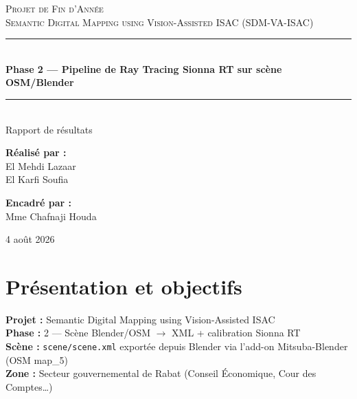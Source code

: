 \documentclass[11pt,a4paper]{article}
\begin{document}
\begin{titlepage}
    \centering
    \vspace*{1.5cm}

    {\large \textsc{Projet de Fin d'Année}}\\[0.3cm]
    {\large \textsc{Semantic Digital Mapping using Vision-Assisted ISAC (SDM-VA-ISAC)}}\\[2cm]

    \rule{\linewidth}{0.5mm}\\[0.4cm]
    {\huge \bfseries Phase 2 --- Pipeline de Ray Tracing Sionna RT sur scène OSM/Blender}\\[0.4cm]
    \rule{\linewidth}{0.5mm}\\[1.5cm]

    {\Large Rapport de résultats}\\[0.3cm]
    

    \begin{minipage}{0.45\textwidth}
        \begin{flushleft} \large
            \textbf{Réalisé par :}\\
            El Mehdi Lazaar\\
            El Karfi Soufia
        \end{flushleft}
    \end{minipage}
    \begin{minipage}{0.45\textwidth}
        \begin{flushright} \large
            \textbf{Encadré par :}\\
            Mme Chafnaji Houda
        \end{flushright}
    \end{minipage}

    \vfill

    {\large 4 août 2026}

\end{titlepage}
\newpage
\clearpage
\tableofcontents
\clearpage

\newpage
\section{Présentation et objectifs}

\textbf{Projet :} Semantic Digital Mapping using Vision-Assisted ISAC \\
\textbf{Phase :} 2 --- Scène Blender/OSM $\to$ XML + calibration Sionna RT \\
\textbf{Scène :} \texttt{scene/scene.xml} exportée depuis Blender via l'add-on Mitsuba-Blender (OSM map\_5) \\
\textbf{Zone :} Secteur gouvernemental de Rabat (Conseil Économique, Cour des Comptes\ldots)
\end{document}
